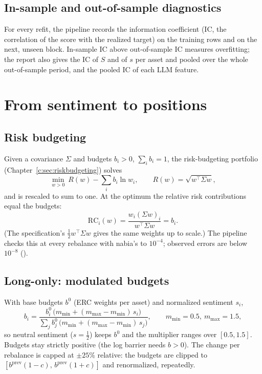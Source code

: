 \section{In-sample and out-of-sample diagnostics}
For every refit, the pipeline records the information coefficient (IC, the correlation of the score with the
realized target) on the training rows and on the next, unseen block. In-sample IC above out-of-sample IC measures
overfitting; the report also gives the IC of $S$ and of $s$ per asset and pooled over the whole out-of-sample
period, and the pooled IC of each LLM feature.
\begin{codepointers}
\end{codepointers}

\chapter{From sentiment to positions}\label{ch:rb-portfolio}

\section{Risk budgeting}
Given a covariance $\Sigma$ and budgets $b_i>0$, $\sum_ib_i=1$, the risk-budgeting portfolio
(Chapter~\ref{c:sec:riskbudgeting}) solves
\[
  \min_{w>0}\ R(w)-\sum_ib_i\ln w_i,\qquad R(w)=\sqrt{w^\top\Sigma w},
\]
and is rescaled to sum to one. At the optimum the relative risk contributions equal the budgets:
\[
  \mathrm{RC}_i(w)=\frac{w_i(\Sigma w)_i}{w^\top\Sigma w}=b_i .
\]
(The specification's $\tfrac12w^\top\Sigma w$ gives the same weights up to scale.) The pipeline checks this at
every rebalance with nabia's  to $10^{-4}$; observed errors are below $10^{-8}$
().

\section{Long-only: modulated budgets}
With base budgets $b^0$ (ERC weights per asset) and normalized sentiment $s_i$,
\[
  b_i=\frac{b_i^0\,\big(m_{\min}+(m_{\max}-m_{\min})\,s_i\big)}{\sum_jb_j^0\,\big(m_{\min}+(m_{\max}-m_{\min})\,s_j\big)},
  \qquad m_{\min}=0.5,\ m_{\max}=1.5,
\]
so neutral sentiment ($s=\tfrac12$) keeps $b^0$ and the multiplier ranges over $[0.5,1.5]$. Budgets stay strictly
positive (the log barrier needs $b>0$). The change per rebalance is capped at $\pm25\%$ relative: the budgets are
clipped to $[b^{\mathrm{prev}}(1-c),\,b^{\mathrm{prev}}(1+c)]$ and renormalized, repeatedly.

